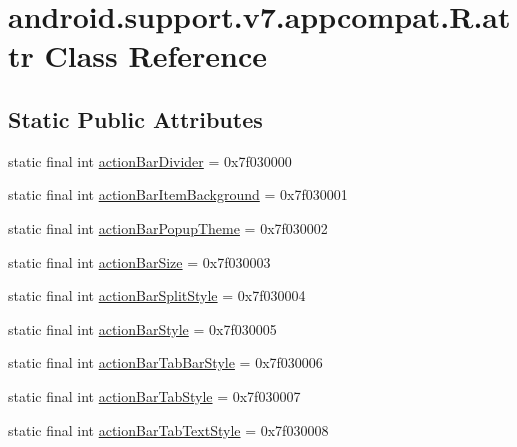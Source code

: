 \hypertarget{classandroid_1_1support_1_1v7_1_1appcompat_1_1R_1_1attr}{}\section{android.\+support.\+v7.\+appcompat.\+R.\+attr Class Reference}
\label{classandroid_1_1support_1_1v7_1_1appcompat_1_1R_1_1attr}
\subsection*{Static Public Attributes}
\begin{DoxyCompactItemize}
\item 
static final int \mbox{\hyperlink{classandroid_1_1support_1_1v7_1_1appcompat_1_1R_1_1attr_ac6a2c7ce44a2166d7e14504e8190c672}{action\+Bar\+Divider}} = 0x7f030000
\item 
static final int \mbox{\hyperlink{classandroid_1_1support_1_1v7_1_1appcompat_1_1R_1_1attr_ace1846ddd415909e0bae74f1522ac978}{action\+Bar\+Item\+Background}} = 0x7f030001
\item 
static final int \mbox{\hyperlink{classandroid_1_1support_1_1v7_1_1appcompat_1_1R_1_1attr_a7e95d0cc1919198b7bf4225527179c2d}{action\+Bar\+Popup\+Theme}} = 0x7f030002
\item 
static final int \mbox{\hyperlink{classandroid_1_1support_1_1v7_1_1appcompat_1_1R_1_1attr_a6c7ea35aa7f4c203811b01339aba964e}{action\+Bar\+Size}} = 0x7f030003
\item 
static final int \mbox{\hyperlink{classandroid_1_1support_1_1v7_1_1appcompat_1_1R_1_1attr_ae16c62a7c9c666348989192343ce0449}{action\+Bar\+Split\+Style}} = 0x7f030004
\item 
static final int \mbox{\hyperlink{classandroid_1_1support_1_1v7_1_1appcompat_1_1R_1_1attr_a1758457942ab79be3d337a155a829ee7}{action\+Bar\+Style}} = 0x7f030005
\item 
static final int \mbox{\hyperlink{classandroid_1_1support_1_1v7_1_1appcompat_1_1R_1_1attr_a81b7cc97e9d9c6c5651f9606d0da5d01}{action\+Bar\+Tab\+Bar\+Style}} = 0x7f030006
\item 
static final int \mbox{\hyperlink{classandroid_1_1support_1_1v7_1_1appcompat_1_1R_1_1attr_ae81eb3b3a822263968720a2735a40e47}{action\+Bar\+Tab\+Style}} = 0x7f030007
\item 
static final int \mbox{\hyperlink{classandroid_1_1support_1_1v7_1_1appcompat_1_1R_1_1attr_ab4fe4a0bc0d16f45089e72120dfef1e2}{action\+Bar\+Tab\+Text\+Style}} = 0x7f030008

\end{DoxyCompactItemize}
